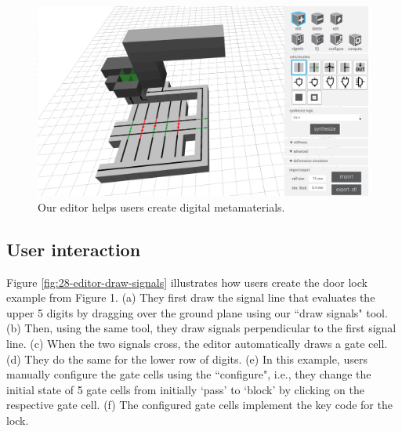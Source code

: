 \begin{figure} [h]
    \includegraphics[width=\textwidth]{chapters/digital-metamaterials-FIG/27-editor-interface.pdf}
    \caption[Short figure name.]{Our editor helps users create digital metamaterials.
    \label{fig:27-editor-interface}}
\end{figure}

\subsection{User interaction}
Figure \ref{fig:28-editor-draw-signals} illustrates how users create the door lock example from Figure 1. (a) They first draw the signal line that evaluates the upper 5 digits by dragging over the ground plane using our ``draw signals" tool. (b) Then, using the same tool, they draw signals perpendicular to the first signal line. (c) When the two signals cross, the editor automatically draws a gate cell. (d) They do the same for the lower row of digits. (e) In this example, users manually configure the gate cells using the ``configure", i.e., they change the initial state of 5 gate cells from initially `pass' to `block' by clicking on the respective gate cell. (f) The configured gate cells implement the key code for the lock. 

